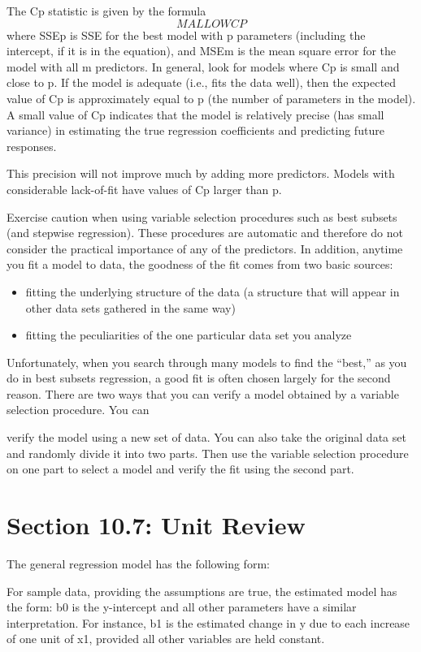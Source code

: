 \documentclass[]{report}
\begin{document}
The Cp statistic is given by the formula
\[MALLOWCP\]
where SSEp is SSE for the best model with p parameters (including the intercept, if it is in the
equation), and MSEm is the mean square error for the model with all m predictors.
In general, look for models where Cp is small and close to p. If the model is adequate (i.e., fits
the data well), then the expected value of Cp is approximately equal to p (the number of
parameters in the model). A small value of Cp indicates that the model is relatively precise (has
small variance) in estimating the true regression coefficients and predicting future responses.

This precision will not improve much by adding more predictors. Models with considerable
lack-of-fit have values of Cp larger than p.


Exercise caution when using variable selection procedures such as best subsets (and stepwise
regression). These procedures are automatic and therefore do not consider the practical
importance of any of the predictors. In addition, anytime you fit a model to data, the goodness of
the fit comes from two basic sources:
\begin{itemize}
	\item fitting the underlying structure of the data (a structure that will appear in other data sets
	gathered in the same way)
\item fitting the peculiarities of the one particular data set you analyze
\end{itemize}

Unfortunately, when you search through many models to find the “best,” as you do in best
subsets regression, a good fit is often chosen largely for the second reason. There are two ways
that you can verify a model obtained by a variable selection procedure. You can

verify the model using a new set of data.
You can also take the original data set and randomly divide it into two parts. Then use the variable selection
procedure on one part to select a model and verify the fit using the second part.
\newpage
\section{Section 10.7: Unit Review}
The general regression model has the following form:

For sample data, providing the assumptions are true, the estimated model has the form:
b0 is the y-intercept and all other parameters have a similar interpretation. For instance,
b1 is the estimated change in y due to each increase of one unit of x1, provided all other
variables are held constant.
\end{document}
